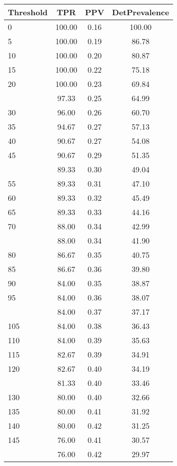 \begin{table}[ht]
\centering
\begin{tabular}{lccc}
  \toprule
Threshold & TPR & PPV & DetPrevalence \\ 
  \midrule
0 & 100.00 & 0.16 & 100.00 \\ 
  5 & 100.00 & 0.19 & 86.78 \\ 
  10 & 100.00 & 0.20 & 80.87 \\ 
  15 & 100.00 & 0.22 & 75.18 \\ 
  20 & 100.00 & 0.23 & 69.84 \\ 
   \addlinespace
25 & 97.33 & 0.25 & 64.99 \\ 
  30 & 96.00 & 0.26 & 60.70 \\ 
  35 & 94.67 & 0.27 & 57.13 \\ 
  40 & 90.67 & 0.27 & 54.08 \\ 
  45 & 90.67 & 0.29 & 51.35 \\ 
   \addlinespace
50 & 89.33 & 0.30 & 49.04 \\ 
  55 & 89.33 & 0.31 & 47.10 \\ 
  60 & 89.33 & 0.32 & 45.49 \\ 
  65 & 89.33 & 0.33 & 44.16 \\ 
  70 & 88.00 & 0.34 & 42.99 \\ 
   \addlinespace
75 & 88.00 & 0.34 & 41.90 \\ 
  80 & 86.67 & 0.35 & 40.75 \\ 
  85 & 86.67 & 0.36 & 39.80 \\ 
  90 & 84.00 & 0.35 & 38.87 \\ 
  95 & 84.00 & 0.36 & 38.07 \\ 
   \addlinespace
100 & 84.00 & 0.37 & 37.17 \\ 
  105 & 84.00 & 0.38 & 36.43 \\ 
  110 & 84.00 & 0.39 & 35.63 \\ 
  115 & 82.67 & 0.39 & 34.91 \\ 
  120 & 82.67 & 0.40 & 34.19 \\ 
   \addlinespace
125 & 81.33 & 0.40 & 33.46 \\ 
  130 & 80.00 & 0.40 & 32.66 \\ 
  135 & 80.00 & 0.41 & 31.92 \\ 
  140 & 80.00 & 0.42 & 31.25 \\ 
  145 & 76.00 & 0.41 & 30.57 \\ 
   \addlinespace
150 & 76.00 & 0.42 & 29.97 \\ 

\end{tabular}
\end{table}
